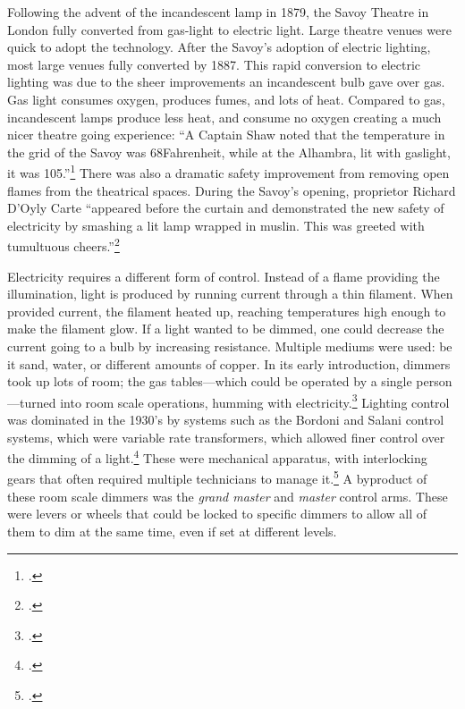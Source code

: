 \documentclass[
    12pt,
    twoside,
    bibstyle=chicago,
    headerstyle=uppercase,
	bibfile=biblatex_updating.bib
]{reedthesis}
\begin{document}
Following the advent of the incandescent lamp in 1879, the Savoy Theatre in London fully converted from gas-light to electric light. Large theatre venues were quick to adopt the technology. After the Savoy's adoption of electric lighting, most large venues fully converted by 1887. This rapid conversion to electric lighting was due to the sheer improvements an incandescent bulb gave over gas. Gas light consumes oxygen, produces fumes, and lots of heat. Compared to gas, incandescent lamps produce less heat, and consume no oxygen creating a much nicer theatre going experience: “A Captain Shaw noted that the temperature in the grid of the Savoy was 68\degree Fahrenheit, while at the Alhambra, lit with gaslight, it was 105\degree.”\footcite[p. 176]{pilbrowStageLightingDesign1997} There was also a dramatic safety improvement from removing open flames from the theatrical spaces. During the Savoy's opening, proprietor Richard D'Oyly Carte “appeared before the curtain and demonstrated the new safety of electricity by smashing a lit lamp wrapped in muslin. This was greeted with tumultuous cheers.”\footcite[p. 175]{pilbrowStageLightingDesign1997}


Electricity requires a different form of control. Instead of a flame providing the illumination, light is produced by running current through a thin filament. When provided current, the filament heated up, reaching temperatures high enough to make the filament glow. If a light wanted to be dimmed, one could decrease the current going to a bulb by increasing resistance. Multiple mediums were used: be it sand, water, or different amounts of copper. In its early introduction, dimmers took up lots of room; the gas tables---which could be operated by a single person---turned into room scale operations, humming with electricity.\footcite[p. 179]{pilbrowStageLightingDesign1997} %
 Lighting control was dominated in the 1930's by systems such as the Bordoni and Salani control systems, which were variable rate transformers, which allowed finer control over the dimming of a light.\footcite[p. 207]{kellerLightFantasticArt2006} These were mechanical apparatus, with interlocking gears that often required multiple technicians to manage it.\footcite[p. 84-89]{benthamStageLighting1980} A byproduct of these room scale dimmers was the \textit{grand master} and \textit{master} control arms. These were levers or wheels that could be locked to specific dimmers to allow all of them to dim at the same time, even if set at different levels.
\end{document}
